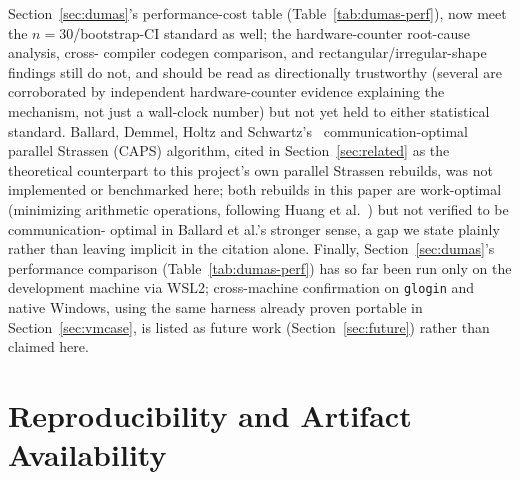 \documentclass[acmsmall]{acmart}
\begin{document}
Section~\ref{sec:dumas}'s performance-cost table
(Table~\ref{tab:dumas-perf}), now meet the $n{=}30$/bootstrap-CI
standard as well; the hardware-counter root-cause analysis, cross-
compiler codegen comparison, and rectangular/irregular-shape findings
still do not, and should be read as directionally trustworthy (several
are corroborated by independent hardware-counter evidence explaining
the mechanism, not just a wall-clock number) but not yet held to either
statistical standard.
Ballard, Demmel, Holtz and Schwartz's~\cite{ballard2012communication}
communication-optimal parallel Strassen (CAPS) algorithm, cited in
Section~\ref{sec:related} as the theoretical counterpart to this
project's own parallel Strassen rebuilds, was not implemented or
benchmarked here; both rebuilds in this paper are work-optimal
(minimizing arithmetic operations, following Huang et
al.~\cite{huang2016strassen}) but not verified to be communication-
optimal in Ballard et al.'s stronger sense, a gap we state plainly
rather than leaving implicit in the citation alone.
Finally, Section~\ref{sec:dumas}'s performance comparison
(Table~\ref{tab:dumas-perf}) has so far been run only on the
development machine via WSL2; cross-machine confirmation on
\texttt{glogin} and native Windows, using the same harness already
proven portable in Section~\ref{sec:vmcase}, is listed as future work
(Section~\ref{sec:future}) rather than claimed here.

\section{Reproducibility and Artifact Availability}
\label{sec:artifact}
\end{document}
